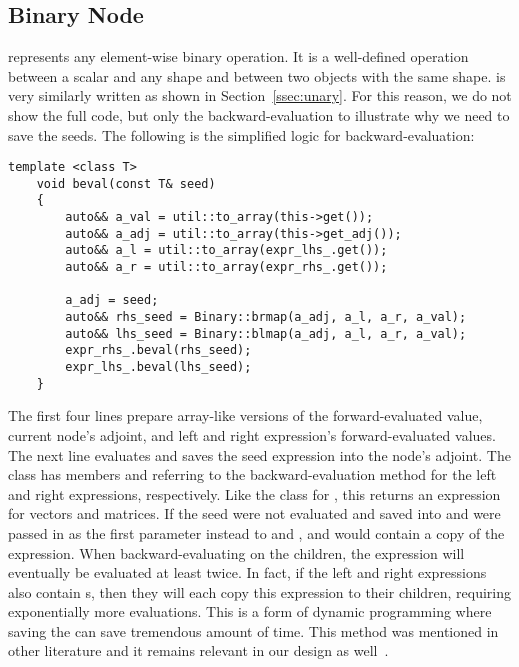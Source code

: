 \subsection{Binary Node}\label{ssec:binary}

 represents any element-wise binary operation.
It is a well-defined operation between a scalar and any shape 
and between two objects with the same shape.
 is very similarly written as  shown in Section~\ref{ssec:unary}.
For this reason, we do not show the full code,
but only the backward-evaluation to illustrate why we need to save the seeds.
The following is the simplified logic for backward-evaluation:
\begin{lstlisting}[style=customcpp]
    template <class T>
    void beval(const T& seed)
    {
        auto&& a_val = util::to_array(this->get());
        auto&& a_adj = util::to_array(this->get_adj());
        auto&& a_l = util::to_array(expr_lhs_.get());
        auto&& a_r = util::to_array(expr_rhs_.get());

        a_adj = seed;
        auto&& rhs_seed = Binary::brmap(a_adj, a_l, a_r, a_val);
        auto&& lhs_seed = Binary::blmap(a_adj, a_l, a_r, a_val);
        expr_rhs_.beval(rhs_seed);
        expr_lhs_.beval(lhs_seed);
    }
\end{lstlisting}
The first four lines prepare array-like versions of the 
forward-evaluated value, current node's adjoint, and
left and right expression's forward-evaluated values.
The next line evaluates and saves the seed expression into the node's adjoint.
The class  has members  and 
referring to the backward-evaluation method for the left and right expressions, respectively.
Like the  class for ,
this returns an  expression for vectors and matrices.
If the seed were not evaluated and saved into 
and  were passed in as the first parameter instead to  and ,
 and  would contain a copy of the  expression.
When backward-evaluating on the children,
the  expression will eventually be evaluated at least twice.
In fact, if the left and right expressions also contain s,
then they will each copy this  expression to their children,
requiring exponentially more evaluations.
This is a form of dynamic programming where saving the  can save tremendous amount of time.
This method was mentioned in other literature and it remains relevant in our design as well~\cite{carpenter:2015}.
